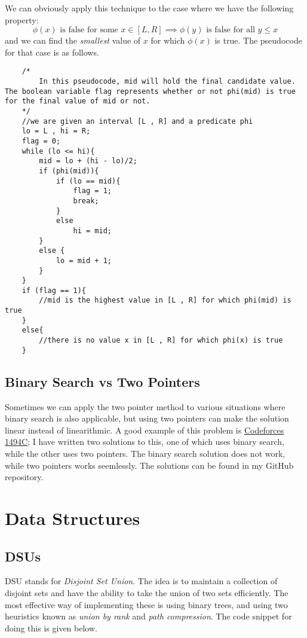 \documentclass[12pt,a4paper]{amsart}
\numberwithin{equation}{section}
\theoremstyle{definition}
\begin{document}
We can obviously apply this technique to the case where we have the following property: 
$$\phi(x)\text{ is false for some }x\in[L , R]\implies \phi(y)\text{ is false for all }y\le x$$
and we can find the \textit{smallest} value of $x$ for which $\phi(x)$ is true. The pseudocode for that case is as follows. 

\begin{lstlisting}
    /*
        In this pseudocode, mid will hold the final candidate value. The boolean variable flag represents whether or not phi(mid) is true for the final value of mid or not. 
    */
    //we are given an interval [L , R] and a predicate phi
    lo = L , hi = R;
    flag = 0;
    while (lo <= hi){
        mid = lo + (hi - lo)/2;
        if (phi(mid)){
            if (lo == mid){
                flag = 1;
                break;
            }
            else 
                hi = mid;
        }
        else {
            lo = mid + 1;
        }
    }
    if (flag == 1){
        //mid is the highest value in [L , R] for which phi(mid) is true
    }
    else{
        //there is no value x in [L , R] for which phi(x) is true
    }
\end{lstlisting}

\subsection{Binary Search vs Two Pointers} Sometimes we can apply the two pointer method to various situations where binary search is also applicable, but using two pointers can make the solution linear instead of linearithmic. A good example of this problem is \href{https://codeforces.com/contest/1494/problem/C}{Codeforces 1494C}; I have written two solutions to this, one of which uses binary search, while the other uses two pointers. The binary search solution does not work, while two pointers works seemlessly. The solutions can be found in my GitHub repository. 

\section{Data Structures}

\subsection{DSUs} DSU stands for \textit{Disjoint Set Union}. The idea is to maintain a collection of disjoint sets and have the ability to take the union of two sets efficiently. The most effective way of implementing these is using binary trees, and using two heuristics known as \textit{union by rank} and \textit{path compression}. The code snippet for doing this is given below. 
\end{document}
